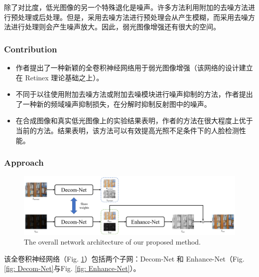\documentclass[letterpaper,10pt]{article}
\begin{document}
			除了对比度，低光图像的另一个特殊退化是噪声。许多方法利用附加的去噪方法进行预处理或后处理。但是，采用去噪方法进行预处理会从产生模糊，而采用去噪方法进行处理则会产生噪声放大。因此，弱光图像增强还有很大的空间。
			
			\subsubsection{Contribution}
			
			\begin{itemize}
				\item[(1)] 
				作者提出了一种新颖的全卷积神经网络用于弱光图像增强（该网络的设计建立在 Retinex 理论基础之上）。
				
				\item[(2)]
				不同于以往使用附加去噪方法或附加去噪模块进行噪声抑制的方法，作者提出了一种新的频域噪声抑制损失，在分解时抑制反射图中的噪声。
				
				\item[(3)]
				在合成图像和真实低光图像上的实验结果表明，作者的方法在很大程度上优于当前的方法。结果表明，该方法可以有效提高光照不足条件下的人脸检测性能。				
			\end{itemize}	
				
			\subsubsection{Approach}
			
			\begin{figure}[htbp]
				\centering 
				\includegraphics[width=\columnwidth]{picture/LLIE/Advanced RetinexNet}
				\caption{
					\label{fig: Advanced RetinexNet} 
					The overall network architecture of our proposed method.
				}
			\end{figure}
			
			该全卷积神经网络（Fig. \ref{fig: Advanced RetinexNet}）包括两个子网：Decom-Net 和 Enhance-Net（Fig. \ref{fig: Decom-Net}与Fig. \ref{fig: Enhance-Net}）。
			
\end{document}
